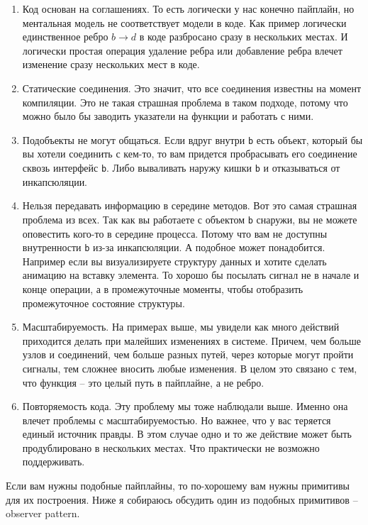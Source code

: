 \begin{enumerate}
\item Код основан на соглашениях.
То есть логически у нас конечно пайплайн, но ментальная модель не соответствует модели в коде.
Как пример логически единственное ребро $b\to d$ в коде разбросано сразу в нескольких местах.
И логически простая операция удаление ребра или добавление ребра влечет изменение сразу нескольких мест в коде.

\item Статические соединения.
Это значит, что все соединения известны на момент компиляции.
Это не такая страшная проблема в таком подходе, потому что можно было бы заводить указатели на функции и работать с ними.

\item Подобъекты не могут общаться.
Если вдруг внутри \verb"b" есть объект, который бы вы хотели соединить с кем-то, то вам придется пробрасывать его соединение сквозь интерфейс \verb"b".
Либо вываливать наружу кишки \verb"b" и отказываться от инкапсюляции.

\item Нельзя передавать информацию в середине методов.
Вот это самая страшная проблема из всех.
Так как вы работаете с объектом \verb"b" снаружи, вы не можете оповестить кого-то в середине процесса.
Потому что вам не доступны внутренности \verb"b" из-за инкапсюляции.
А подобное может понадобится.
Например если вы визуализируете структуру данных и хотите сделать анимацию на вставку элемента.
То хорошо бы посылать сигнал не в начале и конце операции, а в промежуточные моменты, чтобы отобразить промежуточное состояние структуры.

\item Масштабируемость.
На примерах выше, мы увидели как много действий приходится делать при малейших изменениях в системе.
Причем, чем больше узлов и соединений, чем больше разных путей, через которые могут пройти сигналы, тем сложнее вносить любые изменения.
В целом это связано с тем, что функция -- это целый путь в пайплайне, а не ребро.

\item Повторяемость кода.
Эту проблему мы тоже наблюдали выше.
Именно она влечет проблемы с масштабируемостью.
Но важнее, что у вас теряется единый источник правды.
В этом случае одно и то же действие может быть продублировано в нескольких местах.
Что практически не возможно поддерживать.
\end{enumerate}
Если вам нужны подобные пайплайны, то по-хорошему вам нужны примитивы для их построения.
Ниже я собираюсь обсудить один из подобных примитивов -- observer pattern.
